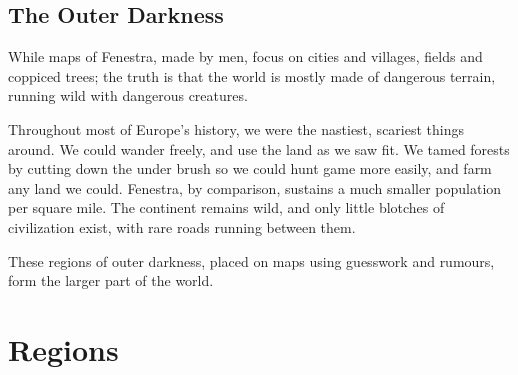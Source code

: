 \begin{multicols}{2}
\subsection{The Outer Darkness}

While maps of Fenestra, made by men, focus on cities and villages, fields and coppiced trees; the truth is that the world is mostly made of dangerous terrain, running wild with dangerous creatures.

Throughout most of Europe's history, we were the nastiest, scariest things around.
We could wander freely, and use the land as we saw fit.
We tamed forests by cutting down the under brush so we could hunt game more easily, and farm any land we could.
Fenestra, by comparison, sustains a much smaller population per square mile.
The continent remains wild, and only little blotches of civilization exist, with rare roads running between them.

These regions of outer darkness, placed on maps using guesswork and rumours, form the larger part of the world.

\end{multicols}

\section{Regions}
\label{regionEncounters}

